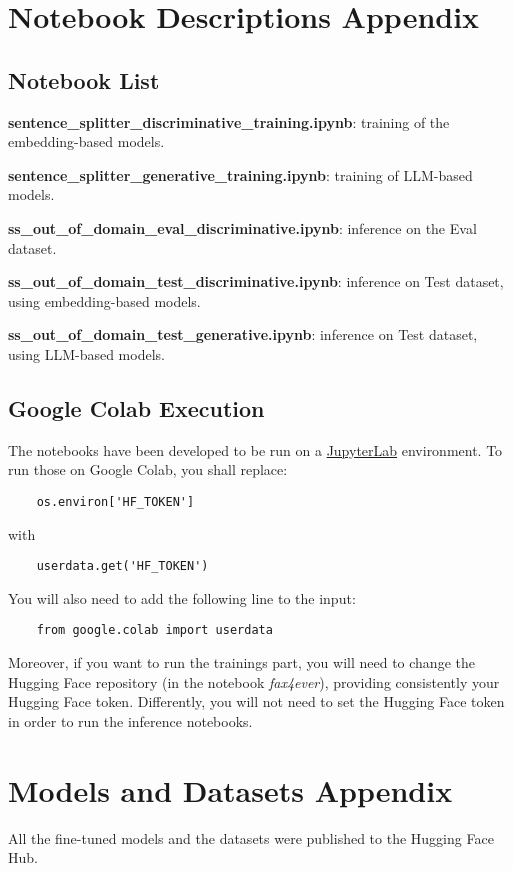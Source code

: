 \documentclass[11pt]{article}
\begin{document}
\section{Notebook Descriptions Appendix}
\label{sec:appendix1}

\subsection{Notebook  List}

\noindent \textbf{sentence\_splitter\_discriminative\_training.ipynb}: training of the embedding-based models.

\noindent  \textbf{sentence\_splitter\_generative\_training.ipynb}: training of LLM-based models.

\noindent \textbf{ss\_out\_of\_domain\_eval\_discriminative.ipynb}: inference on the Eval dataset.

\noindent \textbf{ss\_out\_of\_domain\_test\_discriminative.ipynb}: inference on Test dataset, using embedding-based models.

\noindent \textbf{ss\_out\_of\_domain\_test\_generative.ipynb}:  inference on Test dataset, using LLM-based models.

\subsection{Google Colab Execution}
The notebooks have been developed to be run on a \href{https://jupyterlab.readthedocs.io/en/latest/#}{JupyterLab}
environment. \newline To run those on Google Colab, you shall replace:
\begin{verbatim}
	os.environ['HF_TOKEN']
\end{verbatim}

with

\begin{verbatim}
	userdata.get('HF_TOKEN')
\end{verbatim}
You will also need to add the following line to the input:
\begin{verbatim}
	from google.colab import userdata
\end{verbatim}
Moreover, if you want to run the trainings part, you will need to change the Hugging Face repository (in the notebook \emph{fax4ever}),
providing consistently your Hugging Face token. 
Differently, you will not need to set the Hugging Face token in order to
run the inference notebooks.

\section{Models and Datasets Appendix}
\label{sec:appendix2}
All the fine-tuned models and the datasets were published to the Hugging Face Hub.
\end{document}
